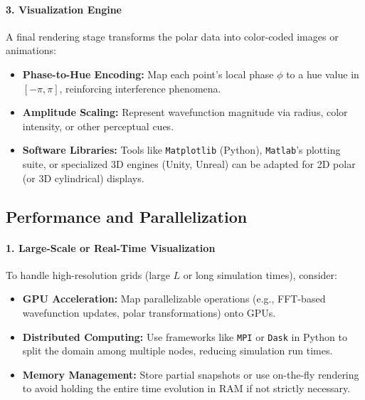 \paragraph{3. Visualization Engine}
A final rendering stage transforms the polar data into color-coded images or animations:
\begin{itemize}
    \item \textbf{Phase-to-Hue Encoding:} Map each point’s local phase \(\phi\) to a hue value in \([- \pi, \pi]\), reinforcing interference phenomena.
    \item \textbf{Amplitude Scaling:} Represent wavefunction magnitude via radius, color intensity, or other perceptual cues.
    \item \textbf{Software Libraries:} Tools like \texttt{Matplotlib} (Python), \texttt{Matlab}’s plotting suite, or specialized 3D engines (Unity, Unreal) can be adapted for 2D polar (or 3D cylindrical) displays.
\end{itemize}


\subsection{Performance and Parallelization}

\paragraph{1. Large-Scale or Real-Time Visualization}
To handle high-resolution grids (large \(L\) or long simulation times), consider:
\begin{itemize}
    \item \textbf{GPU Acceleration:} Map parallelizable operations (e.g., FFT-based wavefunction updates, polar transformations) onto GPUs.
    \item \textbf{Distributed Computing:} Use frameworks like \texttt{MPI} or \texttt{Dask} in Python to split the domain among multiple nodes, reducing simulation run times.
    \item \textbf{Memory Management:} Store partial snapshots or use on-the-fly rendering to avoid holding the entire time evolution in RAM if not strictly necessary.
\end{itemize}

